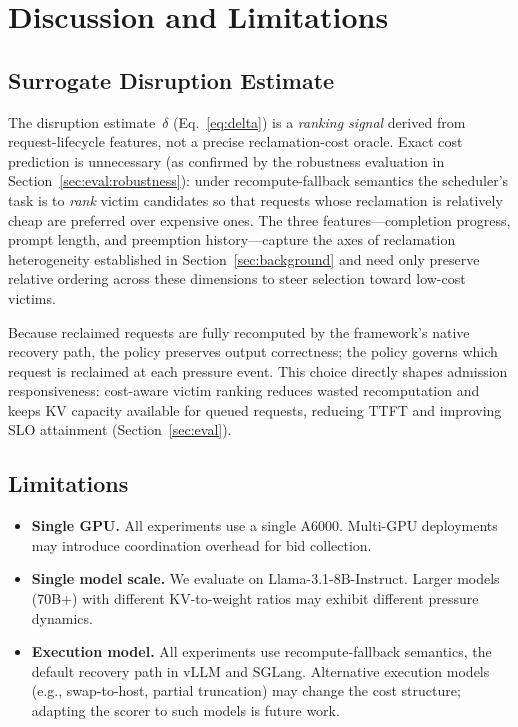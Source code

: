 \documentclass[conference]{IEEEtran}
\newcommand{\qualdelta}{\ensuremath{\delta}}
\begin{document}
\section{Discussion and Limitations}\label{sec:discussion}

\subsection{Surrogate Disruption Estimate}\label{sec:discuss:surrogate}

The disruption estimate~$\qualdelta$ (Eq.~\ref{eq:delta}) is a
\emph{ranking signal} derived from request-lifecycle features, not a precise
reclamation-cost oracle.  Exact cost prediction is unnecessary (as confirmed by the robustness evaluation in Section~\ref{sec:eval:robustness}): under
recompute-fallback semantics the scheduler's task is to \emph{rank} victim
candidates so that requests whose reclamation is relatively cheap are
preferred over expensive ones.  The three features---completion progress,
prompt length, and preemption history---capture the axes of reclamation
heterogeneity established in Section~\ref{sec:background} and need only
preserve relative ordering across these dimensions to steer selection
toward low-cost victims.

Because reclaimed requests are fully recomputed by the framework's native
recovery path, the policy preserves output correctness; the policy governs
which request is reclaimed at each pressure event.
This choice directly shapes admission responsiveness: cost-aware
victim ranking reduces wasted recomputation and keeps KV capacity available
for queued requests, reducing TTFT and improving SLO attainment
(Section~\ref{sec:eval}).

\subsection{Limitations}

\begin{itemize}
\item \textbf{Single GPU.}  All experiments use a single A6000.  Multi-GPU
  deployments may introduce coordination overhead for bid collection.
\item \textbf{Single model scale.}  We evaluate on Llama-3.1-8B-Instruct.
  Larger models (70B+) with different KV-to-weight ratios may exhibit
  different pressure dynamics.
\item \textbf{Execution model.}  All experiments use recompute-fallback
  semantics, the default recovery path in vLLM and SGLang.  Alternative
  execution models (e.g., swap-to-host, partial truncation) may change
  the cost structure; adapting the scorer to such models is future work.
\end{itemize}
\end{document}
